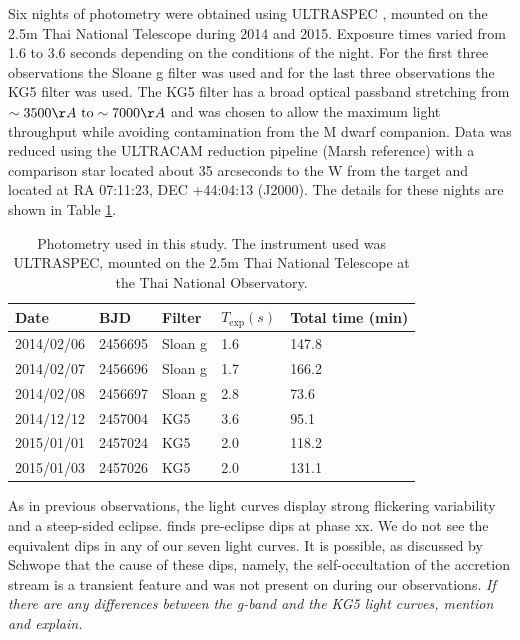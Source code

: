 \documentclass[a4paper,fleqn,usenatbib]{mnras}
\begin{document}
Six nights of photometry were obtained using ULTRASPEC \citep{ULTRASPEC}, mounted on the 2.5m Thai National Telescope during 2014 and 2015. Exposure times varied from 1.6 to 3.6 seconds depending on the conditions of the night. For the first three observations the Sloane g filter was used and for the last three observations the KG5 filter was used. The KG5 filter has a broad optical passband stretching from $\sim3500 \AA~ \mbox{to} \sim7000 \AA$ and was chosen to allow the maximum light throughput while avoiding contamination from the M dwarf companion.  Data was reduced using the ULTRACAM reduction pipeline (Marsh reference) with a comparison star located about 35 arcseconds to the W from the target and located at RA 07:11:23, DEC +44:04:13 (J2000). The details for these nights are shown in Table \ref{tab:photometry}. 

\begin{table}
  \caption{Photometry used in this study. The instrument used was ULTRASPEC, mounted on the 2.5m Thai National Telescope at the Thai National Observatory.}
  \begin{tabular}{ l  l  l  l  l  }
  \hline
  Date & BJD & Filter & $T_{\mbox{exp}}(s)$& Total time (min)\\
  \hline
    2014/02/06 & 2456695 & Sloan g & 1.6 & 147.8 \\
    2014/02/07 & 2456696 & Sloan g & 1.7 & 166.2 \\
    2014/02/08 & 2456697 & Sloan g & 2.8 & 73.6 \\
    2014/12/12 & 2457004 & KG5 & 3.6 & 95.1 \\
    2015/01/01 & 2457024 & KG5 & 2.0 & 118.2 \\
    2015/01/03 & 2457026 & KG5 & 2.0 & 131.1 \\
    
  \hline
  \end{tabular}
  \label{tab:photometry}
\end{table}

As in previous observations, the light curves display strong flickering variability and a steep-sided eclipse. \citet{Schwope2015} finds pre-eclipse dips at phase xx. We do not see the equivalent dips in any of our seven light curves. It is possible, as discussed by Schwope that the cause of these dips, namely, the self-occultation of the accretion stream is a transient feature and was not present on during our observations. \emph{If there are any differences between the g-band and the KG5 light curves, mention and explain.}
\end{document}
